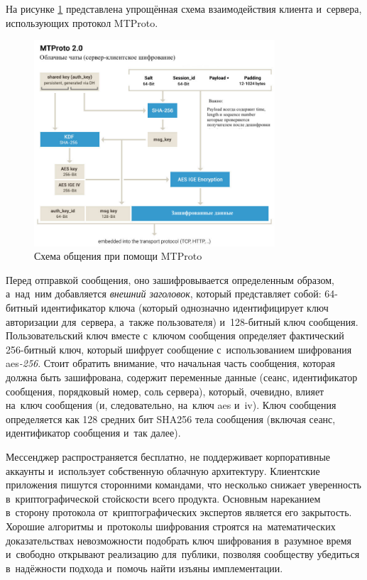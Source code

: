 На рисунке \ref{sec:analysis:research:analogs:telegram:mtproto1} представлена упрощённая схема взаимодействия клиента и~сервера, использующих протокол MTProto.

\begin{figure}[h]
  \centering
    \includegraphics[width=0.8\textwidth]{inc/img/mtproto1.jpeg}
  \caption{Схема общения при помощи MTProto}
  \label{sec:analysis:research:analogs:telegram:mtproto1}
\end{figure}

Перед отправкой сообщения, оно зашифровывается определенным образом, а~над~ним добавляется \textit{внешний заголовок}, который представляет собой: 64-битный идентификатор ключа (который однозначно идентифицирует ключ авторизации для~сервера, а~также пользователя) и~128-битный ключ сообщения. Пользовательский ключ вместе с~ключом сообщения определяет фактический 256-битный ключ, который шифрует сообщение с~использованием шифрования \gls{aes}\textit{-256}. Стоит обратить внимание, что начальная часть сообщения, которая должна быть зашифрована, содержит переменные данные (сеанс, идентификатор сообщения, порядковый номер, соль сервера), который, очевидно, влияет на~ключ сообщения (и, следовательно, на~ключ \gls{aes} и~iv). Ключ сообщения определяется как 128 средних бит SHA256 тела сообщения (включая сеанс, идентификатор сообщения и~так далее).

Мессенджер распространяется бесплатно, не поддерживает корпоративные аккаунты и~использует собственную облачную архитектуру. Клиентские приложения пишутся сторонними командами, что несколько снижает уверенность в~криптографической стойскости всего продукта. Основным нареканием в~сторону протокола от~криптографических экспертов является его закрытость. Хорошие алгоритмы и~протоколы шифрования строятся на~математических доказательствах невозможности подобрать ключ шифрования в~разумное время и~свободно открывают реализацию для~публики, позволяя сообществу убедиться в~надёжности подхода и~помочь найти изъяны имплементации.